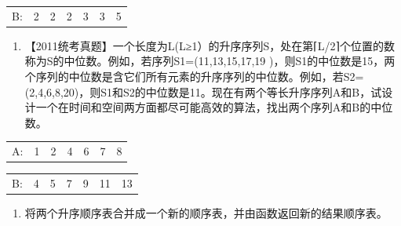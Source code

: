 \documentclass[lang=cn,newtx,10pt,scheme=chinese]{../../elegantbook}
\begin{document}
\begin{table}[!htbp]
\centering
\begin{tabular}{c|c|c|c|c|c|c|}
\cline{2-7}
B: & 2 & 2 & 2 & 3 & 3 & 5 \\
\cline{2-7}
\end{tabular}
\end{table}

\begin{enumerate}
\def\labelenumi{\arabic{enumi}.}
\setcounter{enumi}{5}

\begin{table}[!htbp]
\centering
\begin{tabular}{c|c|c|}
\cline{2-3}
C: & 1 & 4 \\
\cline{2-3}
\end{tabular}
\end{table}
\vspace{5cm}
\item
  
  【2011统考真题】一个长度为L(L≥1）的升序序列S，处在第⌈L/2⌉个位置的数称为S的中位数。例如，若序列S1=(11,13,15,17,19
  )，则S1的中位数是15，两个序列的中位数是含它们所有元素的升序序列的中位数。例如，若S2=(2,4,6,8,20)，则S1和S2的中位数是11。现在有两个等长升序序列A和B，试设计一个在时间和空间两方面都尽可能高效的算法，找出两个序列A和B的中位数。
  


\end{enumerate}

\begin{table}[!htbp]
\centering
\begin{tabular}{c|c|c|c|c|c|c|}
\cline{2-7}
A: & 1 & 2 & 4 & 6 & 7 & 8 \\
\cline{2-7}
\end{tabular}
\end{table}



\begin{table}[!htbp]
\centering
\begin{tabular}{c|c|c|c|c|c|c|}
\cline{2-7}
B: & 4 & 5 & 7 & 9 & 11 & 13 \\
\cline{2-7}
\end{tabular}
\end{table}

\begin{enumerate}
\def\labelenumi{\arabic{enumi}.}
\setcounter{enumi}{6}
\vspace{5cm}
\item
  
  将两个升序顺序表合并成一个新的顺序表，并由函数返回新的结果顺序表。
  


\end{enumerate}
\end{document}
